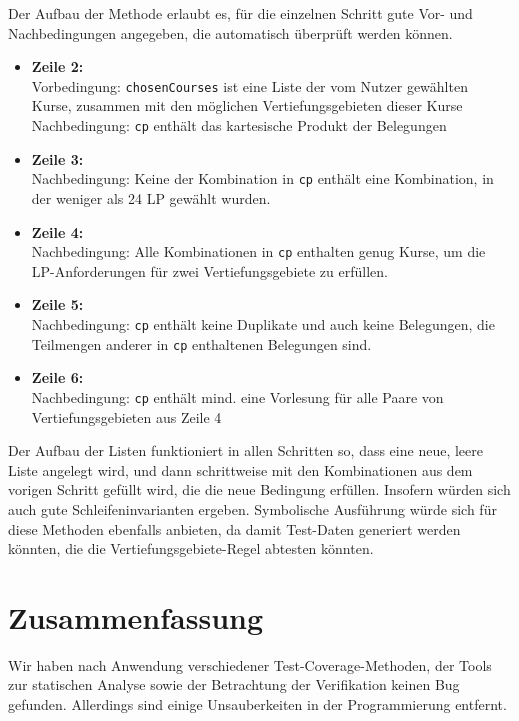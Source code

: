 \documentclass[ngerman]{article}
\begin{document}
Der Aufbau der Methode erlaubt es, für die einzelnen Schritt gute Vor- und Nachbedingungen angegeben, die automatisch überprüft werden können.
\begin{itemize}
    \item
        \textbf{Zeile 2:} \\
        Vorbedingung: \texttt{chosenCourses} ist eine Liste der vom Nutzer gewählten Kurse, zusammen mit den möglichen Vertiefungsgebieten dieser Kurse
        Nachbedingung: \texttt{cp} enthält das kartesische Produkt der Belegungen
    \item
        \textbf{Zeile 3:} \\
        Nachbedingung: Keine der Kombination in \texttt{cp} enthält eine Kombination, in der weniger als 24 LP gewählt wurden.
    \item
        \textbf{Zeile 4:} \\
        Nachbedingung: Alle Kombinationen in \texttt{cp} enthalten genug Kurse, um die LP-Anforderungen für zwei Vertiefungsgebiete zu erfüllen.
    \item
        \textbf{Zeile 5:} \\
        Nachbedingung: \texttt{cp} enthält keine Duplikate und auch keine Belegungen, die Teilmengen anderer in \texttt{cp} enthaltenen Belegungen sind.
    \item
        \textbf{Zeile 6:} \\
        Nachbedingung: \texttt{cp} enthält mind. eine Vorlesung für alle Paare von Vertiefungsgebieten aus Zeile 4
\end{itemize}
Der Aufbau der Listen funktioniert in allen Schritten so, dass eine neue, leere Liste angelegt wird, und dann schrittweise mit den Kombinationen aus dem vorigen Schritt gefüllt wird, die die neue Bedingung erfüllen.
Insofern würden sich auch gute Schleifeninvarianten ergeben.
Symbolische Ausführung würde sich für diese Methoden ebenfalls anbieten, da damit Test-Daten generiert werden könnten, die die Vertiefungsgebiete-Regel abtesten könnten.

\section{Zusammenfassung}

Wir haben nach Anwendung verschiedener Test-Coverage-Methoden, der Tools zur statischen Analyse sowie der Betrachtung der Verifikation keinen Bug gefunden.
Allerdings sind einige Unsauberkeiten in der Programmierung entfernt.
\end{document}
